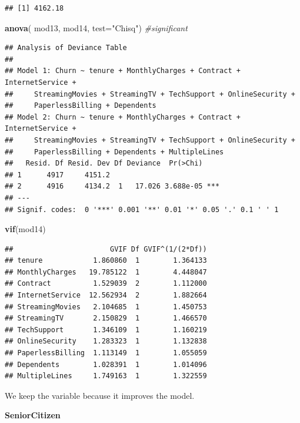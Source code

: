 \documentclass[
  twoside]{article}
\newenvironment{Shaded}{\begin{snugshade}}{\end{snugshade}}
\newcommand{\AttributeTok}[1]{\textcolor[rgb]{0.13,0.29,0.53}{#1}}
\newcommand{\CommentTok}[1]{\textcolor[rgb]{0.56,0.35,0.01}{\textit{#1}}}
\newcommand{\FunctionTok}[1]{\textcolor[rgb]{0.13,0.29,0.53}{\textbf{#1}}}
\newcommand{\NormalTok}[1]{#1}
\newcommand{\StringTok}[1]{\textcolor[rgb]{0.31,0.60,0.02}{#1}}
\begin{document}
\begin{verbatim}
## [1] 4162.18
\end{verbatim}

\begin{Shaded}
\begin{Highlighting}[]
\FunctionTok{anova}\NormalTok{( mod13, mod14,  }\AttributeTok{test=}\StringTok{"Chisq"}\NormalTok{) }\CommentTok{\#significant}
\end{Highlighting}
\end{Shaded}

\begin{verbatim}
## Analysis of Deviance Table
## 
## Model 1: Churn ~ tenure + MonthlyCharges + Contract + InternetService + 
##     StreamingMovies + StreamingTV + TechSupport + OnlineSecurity + 
##     PaperlessBilling + Dependents
## Model 2: Churn ~ tenure + MonthlyCharges + Contract + InternetService + 
##     StreamingMovies + StreamingTV + TechSupport + OnlineSecurity + 
##     PaperlessBilling + Dependents + MultipleLines
##   Resid. Df Resid. Dev Df Deviance  Pr(>Chi)    
## 1      4917     4151.2                          
## 2      4916     4134.2  1   17.026 3.688e-05 ***
## ---
## Signif. codes:  0 '***' 0.001 '**' 0.01 '*' 0.05 '.' 0.1 ' ' 1
\end{verbatim}

\begin{Shaded}
\begin{Highlighting}[]
\FunctionTok{vif}\NormalTok{(mod14)}
\end{Highlighting}
\end{Shaded}

\begin{verbatim}
##                       GVIF Df GVIF^(1/(2*Df))
## tenure            1.860860  1        1.364133
## MonthlyCharges   19.785122  1        4.448047
## Contract          1.529039  2        1.112000
## InternetService  12.562934  2        1.882664
## StreamingMovies   2.104685  1        1.450753
## StreamingTV       2.150829  1        1.466570
## TechSupport       1.346109  1        1.160219
## OnlineSecurity    1.283323  1        1.132838
## PaperlessBilling  1.113149  1        1.055059
## Dependents        1.028391  1        1.014096
## MultipleLines     1.749163  1        1.322559
\end{verbatim}

We keep the variable because it improves the model.

\textbf{SeniorCitizen}
\end{document}
